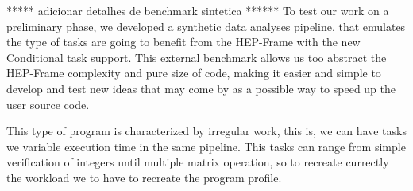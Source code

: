 ***** adicionar detalhes de benchmark sintetica ******
To test our work on a preliminary phase, we developed a synthetic data analyses pipeline, that emulates the type of tasks are going to benefit from the HEP-Frame with the new Conditional task support. This external benchmark allows us too abstract the HEP-Frame complexity and pure size of code, making it easier and simple to develop and test new ideas that may come by as a possible way to speed up the user source code.

This type of program is characterized by irregular work, this is, we can have tasks we variable execution time in the same pipeline. This tasks can range from simple verification of integers until 
multiple matrix operation, so to recreate currectly the workload we to have to recreate the program profile.